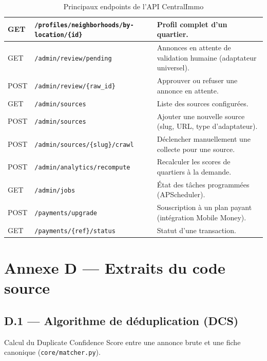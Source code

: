 \begin{table}[H]
\begin{tabularx}{\textwidth}{|l|l|X|}
        GET  & \texttt{/profiles/neighborhoods/by-location/\{id\}} & Profil complet d'un quartier. \\ \hline
        GET  & \texttt{/admin/review/pending} & Annonces en attente de validation humaine (adaptateur universel). \\ \hline
        POST & \texttt{/admin/review/\{raw\_id\}} & Approuver ou refuser une annonce en attente. \\ \hline
        GET  & \texttt{/admin/sources} & Liste des sources configur\'ees. \\ \hline
        POST & \texttt{/admin/sources} & Ajouter une nouvelle source (slug, URL, type d'adaptateur). \\ \hline
        POST & \texttt{/admin/sources/\{slug\}/crawl} & D\'eclencher manuellement une collecte pour une source. \\ \hline
        POST & \texttt{/admin/analytics/recompute} & Recalculer les scores de quartiers \`a la demande. \\ \hline
        GET  & \texttt{/admin/jobs} & \'Etat des t\^aches programm\'ees (APScheduler). \\ \hline
        POST & \texttt{/payments/upgrade} & Souscription \`a un plan payant (int\'egration Mobile Money). \\ \hline
        GET  & \texttt{/payments/\{ref\}/status} & Statut d'une transaction. \\ \hline
    \end{tabularx}
    \caption{Principaux endpoints de l'API CentralImmo}
    \label{tab:api_endpoints}
\end{table}


\chapter*{Annexe D --- Extraits du code source}
\label{annexe:code}

\section*{D.1 --- Algorithme de d\'eduplication (DCS)}

Calcul du Duplicate Confidence Score entre une annonce brute et une fiche canonique (\texttt{core/matcher.py}).

